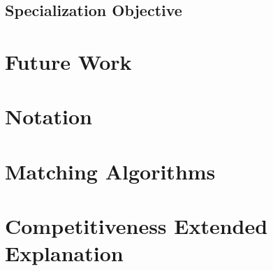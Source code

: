 \documentclass{article}
\begin{document}


\subsection{Specialization Objective}



\section{Future Work}



\newpage

\appendix
\appendixpage
\addappheadtotoc

\section{Notation}



\section{Matching Algorithms}
\label{Matching}



\section{Competitiveness Extended Explanation}
\label{Competitiveness_Extended}




% 

% 

% 

% 


% 


% 

% 


\nocite{*}


\end{document}
